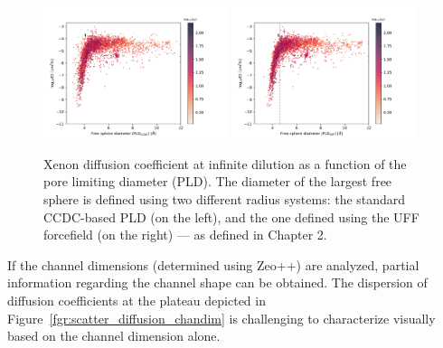 \documentclass[main]{subfiles}
\begin{document}
\begin{figure}[ht]
  \centering
    \includegraphics[width=0.48\textwidth]{figures/5-diffusion/D_log-diameter_ccdc_colored_s_+.pdf}
    \includegraphics[width=0.48\textwidth]{figures/5-diffusion/D_log-diameter_colored_s_+.pdf}
    \caption{Xenon diffusion coefficient at infinite dilution as a function of the pore limiting diameter (PLD). The diameter of the largest free sphere is defined using two different radius systems: the standard CCDC-based PLD (on the left), and the one defined using the UFF forcefield (on the right)\autocite{Hung_2021} --- as defined in Chapter 2. }\label{fgr:diff_pld}
\end{figure}

If the channel dimensions (determined using Zeo++) are analyzed, partial information regarding the channel shape can be obtained. The dispersion of diffusion coefficients at the plateau depicted in Figure~\ref{fgr:scatter_diffusion_chandim} is challenging to characterize visually based on the channel dimension alone. 
\end{document}
